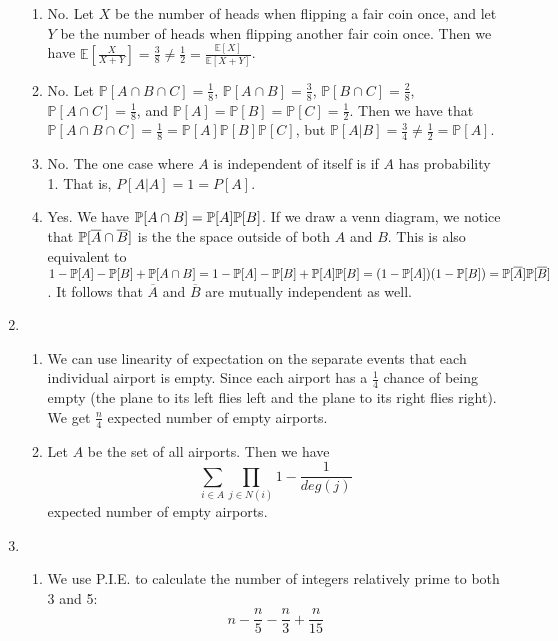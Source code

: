 \begin{enumerate}
\begin{enumerate}
        \item No. Let $X$ be the number of heads when flipping a fair coin once, and let $Y$ be the number of heads when flipping another fair coin once. Then we have $\mathbb{E}[\frac{X}{X+Y}] = \frac{3}{8} \neq \frac{1}{2} = \frac{\mathbb{E}[X]}{\mathbb{E}[X+Y]}$.
        
        \item No. Let $\mathbb{P}[A \cap B \cap C] = \frac{1}{8}$, $\mathbb{P}[A \cap B] = \frac{3}{8}$, $\mathbb{P}[B \cap C] = \frac{2}{8}$, $\mathbb{P}[A \cap C] = \frac{1}{8}$, and $\mathbb{P}[A] = \mathbb{P}[B] = \mathbb{P}[C] = \frac{1}{2}$. Then we have that $\mathbb{P}[A \cap B \cap C] = \frac{1}{8} = \mathbb{P}[A]\mathbb{P}[B]\mathbb{P}[C]$, but $\mathbb{P}[A|B] = \frac{3}{4} \neq \frac{1}{2} = \mathbb{P}[A]$.
        
        \item No. The one case where $A$ is independent of itself is if $A$ has probability 1. That is, $P[A|A] = 1 = P[A]$.
        
        \item Yes. We have $\P[A \cap B] = \P[A]\P[B]$. If we draw a venn diagram, we notice that $\P[\overline{A} \cap \overline{B}]$ is the the space outside of both $A$ and $B$. This is also equivalent to $1 - \P[A] - \P[B] + \P[A \cap B] = 1 - \P[A] - \P[B] + \P[A]\P[B] = (1 - \P[A])(1 - \P[B]) = \P[\overline{A}]\P[\overline{B}]$. It follows that $\overline{A}$ and $\overline{B}$ are mutually independent as well.
    \end{enumerate}
    
    \item \begin{enumerate}
        \item We can use linearity of expectation on the separate events that each individual airport is empty. Since each airport has a $\frac{1}{4}$ chance of being empty (the plane to its left flies left and the plane to its right flies right). We get $\frac{n}{4}$ expected number of empty airports.
        
        \item Let $A$ be the set of all airports. Then we have 
        \[
        \sum\limits_{i \in A}\prod\limits_{j \in N(i)} 1 - \frac{1}{deg(j)}
        \]
        expected number of empty airports.
    \end{enumerate}
    
    \item \begin{enumerate}
        \item We use P.I.E. to calculate the number of integers relatively prime to both 3 and 5:
        \[
        n - \frac{n}{5} - \frac{n}{3} + \frac{n}{15}
        \]
        

\end{enumerate}
\end{enumerate}
